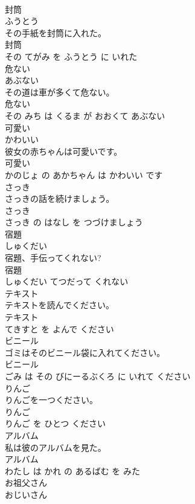 \documentclass[8pt]{extreport}
\begin{document}
\begin{CJK}{UTF8}{min}
\\	封筒	
\\	ふうとう			
\\	その手紙を封筒に入れた。	
\\	封筒 
\\	その てがみ を ふうとう に いれた			
\\	危ない	
\\	あぶない			
\\	その道は車が多くて危ない。	
\\	危ない 
\\	その みち は くるま が おおくて あぶない			
\\	可愛い	
\\	かわいい			
\\	彼女の赤ちゃんは可愛いです。	
\\	可愛い 
\\	かのじょ の あかちゃん は かわいい です			
\\	さっき	
\\	さっきの話を続けましょう。	
\\	さっき 
\\	さっき の はなし を つづけましょう			
\\	宿題	
\\	しゅくだい			
\\	宿題、手伝ってくれない?	
\\	宿題 
\\	しゅくだい てつだって くれない			
\\	テキスト	
\\	テキストを読んでください。	
\\	テキスト 
\\	てきすと を よんで ください			
\\	ビニール	
\\	ゴミはそのビニール袋に入れてください。	
\\	ビニール 
\\	ごみ は その びにーるぶくろ に いれて ください			
\\	りんご	
\\	りんごを一つください。	
\\	りんご 
\\	りんご を ひとつ ください			
\\	アルバム	
\\	私は彼のアルバムを見た。	
\\	アルバム 
\\	わたし は かれ の あるばむ を みた			
\\	お祖父さん	
\\	おじいさん			

\end{CJK}
\end{document}
